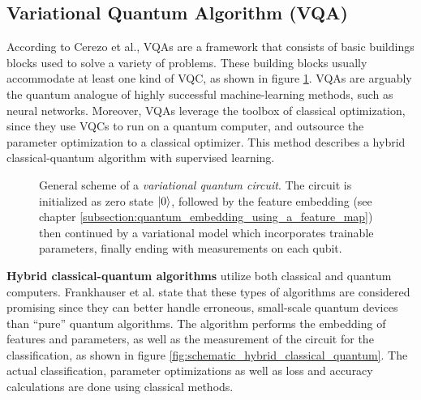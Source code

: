 \subsection{Variational Quantum Algorithm (VQA)}
\label{subsection:vqa_fundamentals}
According to Cerezo et al.\cite{Cerezo_2021}, VQAs are a framework that consists of basic buildings blocks used to solve a variety of problems. These building blocks usually accommodate at least one kind of VQC, as shown in figure \ref{fig:general_scheme_vqc}. VQAs are arguably the quantum analogue of highly successful machine-learning methods, such as neural networks. Moreover, VQAs leverage the toolbox of classical optimization, since they use VQCs to run on a quantum computer, and outsource the parameter optimization to a classical optimizer. This method describes a hybrid classical-quantum algorithm with supervised learning.

\begin{figure}[!h]
    \centering
    \caption{General scheme of a \textit{variational quantum circuit}. The circuit is initialized as zero state $\ket{0}$, followed by the feature 
    embedding (see chapter \ref{subsection:quantum_embedding_using_a_feature_map}) then continued by a variational model which incorporates trainable parameters, finally ending with measurements on each qubit.} 
    \label{fig:general_scheme_vqc}
\end{figure}

\textbf{Hybrid classical-quantum algorithms} utilize both classical and quantum computers. Frankhauser et al.\cite{fankhauser_multiple_2021} state that these types of algorithms are considered promising since they can better handle erroneous, small-scale quantum devices than “pure” quantum algorithms. The algorithm performs the embedding of features and parameters, as well as the measurement of the circuit for the classification, as shown in figure \ref{fig:schematic_hybrid_classical_quantum}. The actual classification, parameter optimizations as well as loss and accuracy calculations are done using classical methods. 

